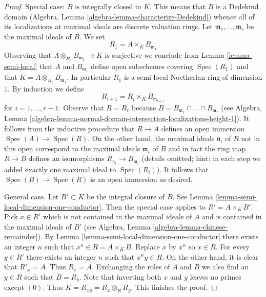 \documentclass[10pt,a4paper]{amsart}
\theoremstyle{plain}
\theoremstyle{definition}
\theoremstyle{remark}
\numberwithin{equation}{subsection}
\def\Spec{\mathop{\mathrm{Spec}}}
\begin{document}
\begin{proof}
Special case: $B$ is integrally closed in $K$. This means that
$B$ is a Dedekind domain
(Algebra, Lemma \ref{algebra-lemma-characterize-Dedekind})
whence all of its localizations at maximal ideals are discrete valuation rings.
Let $\mathfrak m_1, \ldots, \mathfrak m_r$ be the maximal ideals of
$B$. We set
$$
R_1 = A \times_K B_{\mathfrak m_1}
$$
Observing that $A \otimes_{R_1} B_{\mathfrak m_1} \to K$ is surjective
we conclude from Lemma \ref{lemma-semi-local} that $A$ and
$B_{\mathfrak m_1}$ define open subschemes covering $\Spec(R_1)$ and that
$K = A \otimes_{R_1} B_{\mathfrak m_1}$. In particular $R_1$ is a
semi-local Noetherian ring of dimension $1$. By induction we define
$$
R_{i + 1} = R_i \times_K B_{\mathfrak m_{i + 1}}
$$
for $i = 1, \ldots, r - 1$. Observe that $R = R_r$ because
$B = B_{\mathfrak m_1} \cap \ldots \cap B_{\mathfrak m_r}$ (see
Algebra, Lemma
\ref{algebra-lemma-normal-domain-intersection-localizations-height-1}).
It follows from the inductive procedure that $R \to A$ defines an
open immersion $\Spec(A) \to \Spec(R)$. On the other hand, the
maximal ideals $\mathfrak n_i$ of $R$ not in this open correspond
to the maximal ideals $\mathfrak m_i$ of $B$ and in fact
the ring map $R \to B$ defines an isomorphisms
$R_{\mathfrak n_i} \to B_{\mathfrak m_i}$ (details omitted; hint:
in each step we added exactly one maximal ideal to $\Spec(R_i)$).
It follows that $\Spec(B) \to \Spec(R)$ is an open immersion
as desired.

\medskip\noindent
General case. Let $B' \subset K$ be the integral closure of $B$.
See Lemma \ref{lemma-semi-local-dimension-one-conductor}.
Then the special case applies to $R' = A \times_K B'$.
Pick $x \in R'$ which is not contained in the maximal
ideals of $A$ and is contained in the maximal ideals of $B'$
(see Algebra, Lemma \ref{algebra-lemma-chinese-remainder}).
By Lemma \ref{lemma-semi-local-dimension-one-conductor}
there exists an integer $n$ such that $x^n \in R = A \times_K B$.
Replace $x$ by $x^n$ so $x \in R$. For every $y \in R'$ there exists
an integer $n$ such that $x^n y \in R$. On the other hand,
it is clear that $R'_x = A$. Thus $R_x = A$.
Exchanging the roles of $A$ and $B$ we also find an $y \in R$
such that $B = R_y$. Note that inverting both $x$ and $y$
leaves no primes except $(0)$. Thus $K = R_{xy} = R_x \otimes_R R_y$.
This finishes the proof.
\end{proof}
\end{document}
